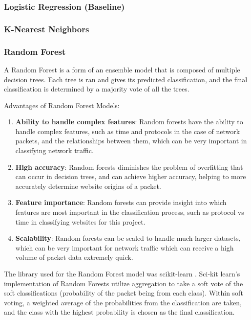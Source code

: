 \documentclass[10pt,sigconf,letterpaper,nonacm]{acmart}
\begin{document}
\subsubsection{Logistic Regression (Baseline)}

\subsubsection{K-Nearest Neighbors}

\subsubsection{Random Forest}
A Random Forest is a form of an ensemble model that is composed of multiple decision trees. Each tree is ran and gives its predicted classification, and the final classification is determined by a majority vote of all the trees.

Advantages of Random Forest Models:
\begin{enumerate}
  \item \textbf{Ability to handle complex features}: Random forests have the ability to handle complex features, such as time and protocols in the case of network packets, and the relationships between them, which can be very important in classifying network traffic.
  \item \textbf{High accuracy}: Random forests diminishes the problem of overfitting that can occur in decision trees, and can achieve higher accuracy, helping to more accurately determine website origins of a packet.
  \item \textbf{Feature importance}: Random forests can provide insight into which features are most important in the classification process, such as protocol vs time in classifying websites for this project.
  \item \textbf{Scalability}: Random forests can be scaled to handle much larger datasets, which can be very important for network traffic which can receive a high volume of packet data extremely quick.
\end{enumerate}

The library used for the Random Forest model was scikit-learn \cite{scikit-learn}. Sci-kit learn's implementation of Random Forests utilize aggregation to take a soft vote of the soft classifications (probability of the packet being from each class). Within soft voting, a weighted average of the probabilities from the classification are taken, and the class with the highest probability is chosen as the final classification.
\end{document}
